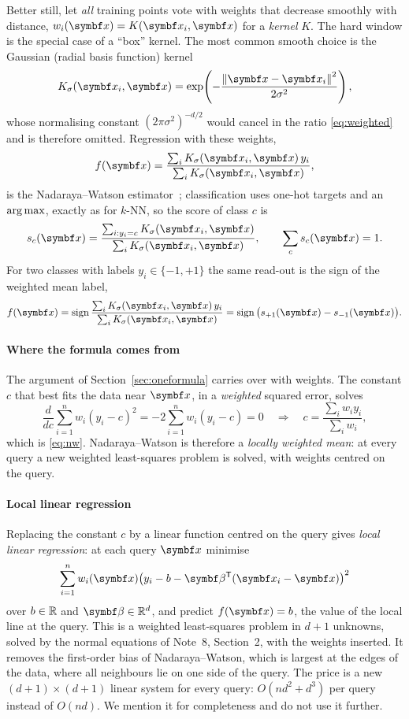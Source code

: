 \documentclass[11pt]{article}
\begin{document}
Better still, let \emph{all} training points vote with weights that decrease smoothly with distance,
$w_i(\x) = K(\x_i, \x)$ for a \emph{kernel} $K$. The hard window is the special case of a ``box'' kernel. The most
common smooth choice is the Gaussian (radial basis function) kernel
\[
  K_\sigma(\x_i, \x) = \exp\!\left( -\frac{\norm{\x - \x_i}^2}{2\sigma^2} \right),
\]
whose normalising constant $(2\pi\sigma^2)^{-d/2}$ would cancel in the ratio \eqref{eq:weighted} and is therefore
omitted. Regression with these weights,
\begin{equation}\label{eq:nw}
  f(\x) = \frac{\sum_i K_\sigma(\x_i, \x)\, y_i}{\sum_i K_\sigma(\x_i, \x)},
\end{equation}
is the Nadaraya--Watson estimator~\cite{nadaraya1964,watson1964}; classification uses one-hot targets and an
$\operatorname*{arg\,max}$, exactly as for $k$-NN, so the score of class $c$ is
\[
  s_c(\x) = \frac{\sum_{i : y_i = c} K_\sigma(\x_i, \x)}{\sum_i K_\sigma(\x_i, \x)}, \qquad \sum_c s_c(\x) = 1 .
\]
For two classes with labels $y_i \in \{-1, +1\}$ the same read-out is the sign of the weighted mean label,
\[
  f(\x) = \operatorname{sign} \frac{\sum_i K_\sigma(\x_i, \x)\, y_i}{\sum_i K_\sigma(\x_i, \x)}
  = \operatorname{sign}\big(s_{+1}(\x) - s_{-1}(\x)\big) .
\]

\paragraph{Where the formula comes from} The argument of Section~\ref{sec:oneformula} carries over with weights. The
constant $c$ that best fits the data near $\x$, in a \emph{weighted} squared error, solves
\[
  \frac{d}{dc} \sum_{i=1}^n w_i (y_i - c)^2 = -2 \sum_{i=1}^n w_i (y_i - c) = 0
  \quad\Longrightarrow\quad c = \frac{\sum_i w_i y_i}{\sum_i w_i},
\]
which is \eqref{eq:nw}. Nadaraya--Watson is therefore a \emph{locally weighted mean}: at every query a new weighted
least-squares problem is solved, with weights centred on the query.

\paragraph{Local linear regression} Replacing the constant $c$ by a linear function centred on the query gives
\emph{local linear regression}: at each query $\x$ minimise
\[
  \sum_{i=1}^n w_i(\x) \big( y_i - b - \vect{\beta}\T(\x_i - \x) \big)^2
\]
over $b \in \mathbb{R}$ and $\vect{\beta} \in \R^d$, and predict $f(\x) = b$, the value of the local line at the query. This is
a weighted least-squares problem in $d + 1$ unknowns, solved by the normal equations of Note~8, Section~2, with the
weights inserted. It removes the first-order bias of Nadaraya--Watson, which is largest at the edges of the data,
where all neighbours lie on one side of the query. The price is a new $(d+1) \times (d+1)$ linear system for every
query: $O(nd^2 + d^3)$ per query instead of $O(nd)$. We mention it for completeness and do not use it further.
\end{document}
